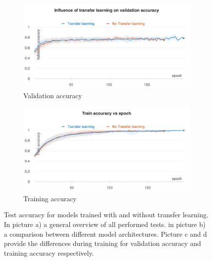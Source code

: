 \begin{figure}[hbtp]
\begin{subfigure}{0.49\textwidth}
		\label{fig:res:sd:ta:tl:arch}
		\end{subfigure}
		\hspace*{\fill}
		\begin{subfigure}{0.49\textwidth}
		\centering
		\includegraphics[width=\linewidth]{fig/results/wandb/spaghetti_dataset/charts/Section-10-Panel-0-rj7vtzd5m}
		\caption{Validation accuracy }
		\label{fig:res:sd:va:tl}
		\end{subfigure}
		\hspace*{\fill}
		\begin{subfigure}{0.49\textwidth}
		\centering
		\includegraphics[width=\linewidth]{fig/results/wandb/spaghetti_dataset/charts/Section-10-Panel-1-gr2eg8ssf}
		\caption{Training accuracy}
		\label{fig:res:sd:tra:tl}
		\end{subfigure}
		\caption{Test accuracy for models trained with and without transfer learning. In picture a) a general overview of all performed tests. in picture b) a comparison between different model architectures. Picture c and d provide the differences during training for validation accuracy and training accuracy respectively.}
	\end{figure}
		



